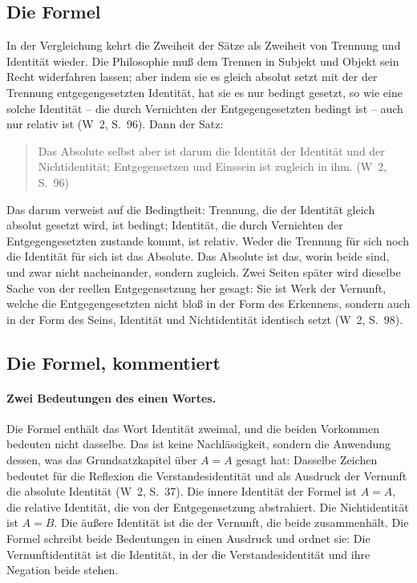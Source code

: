 \documentclass[11pt,a4paper]{article}
\newcommand{\Werke}[1]{(W~2, S.~#1)}
\begin{document}
\subsection{Die Formel}

In der Vergleichung kehrt die Zweiheit der Sätze als Zweiheit von Trennung und Identität wieder. \glqq Die Philosophie muß dem Trennen in Subjekt und Objekt sein Recht widerfahren lassen; aber indem sie es gleich absolut setzt mit der der Trennung entgegengesetzten Identität, hat sie es nur bedingt gesetzt, so wie eine solche Identität -- die durch Vernichten der Entgegengesetzten bedingt ist -- auch nur relativ ist\grqq{} \Werke{96}. Dann der Satz:

\begin{quote}
\glqq Das Absolute selbst aber ist darum die Identität der Identität und der Nichtidentität; Entgegensetzen und Einssein ist zugleich in ihm.\grqq{} \Werke{96}
\end{quote}

Das \glqq darum\grqq{} verweist auf die Bedingtheit: Trennung, die der Identität gleich absolut gesetzt wird, ist bedingt; Identität, die durch Vernichten der Entgegengesetzten zustande kommt, ist relativ. Weder die Trennung für sich noch die Identität für sich ist das Absolute. Das Absolute ist das, worin beide sind, und zwar nicht nacheinander, sondern zugleich. Zwei Seiten später wird dieselbe Sache von der reellen Entgegensetzung her gesagt: Sie ist Werk der Vernunft, \glqq welche die Entgegengesetzten nicht bloß in der Form des Erkennens, sondern auch in der Form des Seins, Identität und Nichtidentität identisch setzt\grqq{} \Werke{98}.

\subsection{Die Formel, kommentiert}

\paragraph{Zwei Bedeutungen des einen Wortes.}
Die Formel enthält das Wort Identität zweimal, und die beiden Vorkommen bedeuten nicht dasselbe. Das ist keine Nachlässigkeit, sondern die Anwendung dessen, was das Grundsatzkapitel über $A = A$ gesagt hat: Dasselbe Zeichen bedeutet für die Reflexion die Verstandesidentität und als Ausdruck der Vernunft die absolute Identität \Werke{37}. Die innere Identität der Formel ist $A = A$, die relative Identität, die von der Entgegensetzung abstrahiert. Die Nichtidentität ist $A = B$. Die äußere Identität ist die der Vernunft, die beide zusammenhält. Die Formel schreibt beide Bedeutungen in einen Ausdruck und ordnet sie: Die Vernunftidentität ist die Identität, in der die Verstandesidentität und ihre Negation beide stehen.
\end{document}
